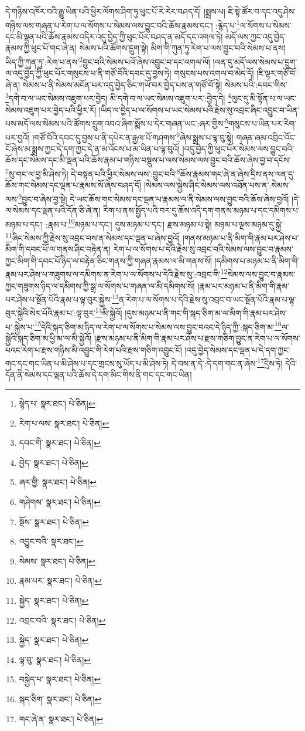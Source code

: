དེ་གཉིས་འཁོར་བའི་རྒྱུ་ཡིན་པའི་ཕྱིར་ལོགས་ཤིག་ཏུ་ཕུང་པོ་རེ་རེར་བཤད་དོ། །སྨྲས་པ། ཇི་སྟེ་ཚོར་བ་དང་འདུ་ཤེས་གཉིས་ལས་གཞན་པ་རེག་པ་ལ་སོགས་པ་སེམས་ལས་བྱུང་བའི་ཆོས་རྣམས་དང་། :རྙེད་པ་\footnote{སྙེད་པ་  སྣར་ཐང་།  པེ་ཅིན། }ལ་སོགས་པ་སེམས་དང་མི་ལྡན་པའི་ཆོས་རྣམས་འདིར་འདུ་བྱེད་ཀྱི་ཕུང་པོར་བཤད་ན་མདོ་དང་འགལ་ཏེ། མདོ་ལས་ཀྱང་འདུ་བྱེད་རྣམས་ཀྱི་ཕུང་པོ་གང་ཞེ་ན། སེམས་པའི་ཚོགས་དྲུག་སྟེ། མིག་གི་ཀུན་ཏུ་རེག་པ་ལས་བྱུང་བའི་སེམས་པ་ནས། ཡིད་ཀྱི་ཀུན་ཏུ་:རེག་པ་ནས་\footnote{རེག་པ་ལས་  སྣར་ཐང་།  པེ་ཅིན། }བྱུང་བའི་སེམས་པའོ་ཞེས་འབྱུང་བ་དང་འགལ་ལོ། །ལན་དུ་མདོ་ལས་སེམས་པ་དྲུག་ལ་འདུ་བྱེད་ཀྱི་ཕུང་པོར་གསུངས་པ་ནི་གཙོ་བོའི་དབང་དུ་བྱས་ཏེ། གསུངས་པས་འགལ་བ་མེད་དོ། །ཇི་ལྟར་གཙོ་བོ་ཞེ་ན། སེམས་པ་ནི་སེམས་མངོན་པར་འདུ་བྱེད་ཅིང་གཡོ་བར་བྱེད་པས་ན་གཙོ་བོ་སྟེ། སེམས་པའི་:དབང་གིས་\footnote{དབང་གི་  སྣར་ཐང་།  པེ་ཅིན། }དགེ་བ་ལ་ཡང་སེམས་འཇུག་པར་བྱེད། མི་དགེ་བ་ལ་ཡང་སེམས་འཇུག་པར་:བྱེད་དེ། \footnote{བྱེད་  སྣར་ཐང་།  པེ་ཅིན། }ལུང་དུ་མི་སྟོན་པ་ལ་ཡང་སེམས་འཇུག་པར་བྱེད་པའི་ཕྱིར་རོ། །ཡིད་ལ་བྱེད་པ་ལ་སོགས་པ་ཡང་སེམས་པའི་རྗེས་སུ་འབྲང་ཞིང་འབྱུང་བ་ཡིན་པས་མདོ་ལས་སེམས་པའི་ཚོགས་དྲུག་འབའ་ཞིག་སྨོས་པ་དེར་གཞན་ཡང་:ཞར་གྱིས་\footnote{ཞར་གྱི་  སྣར་ཐང་།  པེ་ཅིན། }གསུངས་པ་ཡིན་པར་རིག་པར་བྱའོ། །གཙོ་བོའི་དབང་དུ་བྱས་པ་ནི་དཔེར་ན་རྒྱལ་པོ་གཤགས་\footnote{གཤེགས་  སྣར་ཐང་།  པེ་ཅིན། }ཞེས་སྨྲས་པ་ལྟ་བུ་སྟེ། གཞན་ཞམ་འབྲིང་འོང་ངོ་ཞེས་མ་སྨྲས་ཀྱང་དེ་དག་ཀྱང་དེ་ན་མ་འོངས་པ་མ་ཡིན་པ་ལྟ་བུའོ། །འདུ་བྱེད་ཀྱི་ཕུང་པོར་སེམས་ལས་བྱུང་བའི་ཆོས་དང་སེམས་དང་མི་ལྡན་པའི་ཆོས་རྣམ་པ་གཉིས་བསྡུས་པ་ལས་སེམས་ལས་བྱུང་བའི་ཆོས་ཞེས་བྱ་བ་དངོས་\footnote{སྔོས་  སྣར་ཐང་།  པེ་ཅིན། }སུ་གང་ལ་བྱ་མི་ཤེས་ཏེ། དེ་བསྟན་པའི་ཕྱིར་སེམས་ལས་:བྱུང་བའི་\footnote{འབྱུང་བའི་  སྣར་ཐང་། }ཆོས་རྣམས་གང་ཞེ་ན་ཞེས་དྲིས་ནས་ལན་དུ་ཆོས་གང་སེམས་དང་ལྡན་པ་རྣམས་སོ་ཞེས་བཤད་དོ། །སེམས་ལས་སྐྱེས་ཤིང་སེམས་ལས་འཐོན་པས་ན་:སེམས་ལས་\footnote{སེམས་  སྣར་ཐང་།  པེ་ཅིན། }བྱུང་བ་ཞེས་བྱ་སྟེ། དེ་ཡང་ཆོས་གང་སེམས་དང་ལྡན་པ་རྣམས་ལ་ནི་སེམས་ལས་བྱུང་བའི་ཆོས་ཞེས་བྱའོ། །དེ་ལ་སེམས་དང་ལྡན་པའི་དོན་ཅི་ཞེ་ན། རིག་པ་ནས་སྤྱོད་པའི་བར་དུ་ཆོས་འདི་དག་གནས་མཉམ་པ་དང་དམིགས་པ་མཉམ་པ་དང་། :རྣམ་པ་\footnote{རྣམ་པར་  སྣར་ཐང་།  པེ་ཅིན། }མཉམ་པ་དང་། དུས་མཉམ་པ་དང་། རྫས་མཉམ་པ་སྟེ། མཉམ་པ་ལྔས་མཉམ་དུ་སྐྱེ་\footnote{སྐྱེད་  སྣར་ཐང་།  པེ་ཅིན། }ཞིང་སེམས་ཀྱི་རྗེས་སུ་འབྲང་བས་ན་སེམས་དང་ལྡན་པ་ཞེས་བྱའོ། །གནས་མཉམ་པ་ནི་མིག་གི་རྣམ་པར་ཤེས་པ་མིག་གི་དབང་པོ་ལ་གནས་ཤིང་བརྟེན་ན། རེག་པ་ལ་སོགས་པ་དེའི་རྗེས་སུ་འབྲང་བའི་སེམས་ལས་བྱུང་བ་རྣམས་ཀྱང་མིག་གི་དབང་པོ་ཉིད་ལ་བརྟེན་ཅིང་གནས་ཀྱི་གཞན་རྣམས་ལ་མི་གནས་སོ། །དམིགས་པ་མཉམ་པ་ནི་མིག་གི་རྣམ་པར་ཤེས་པ་གཟུགས་ལ་དམིགས་ན་རེག་པ་ལ་སོགས་པ་དེའི་རྗེས་སུ་:འབྲང་གི་\footnote{འབྲང་བའི་  སྣར་ཐང་།  པེ་ཅིན། }སེམས་ལས་བྱུང་བ་རྣམས་ཀྱང་གཟུགས་ཉིད་ལ་དམིགས་ཀྱི་སྒྲ་ལ་སོགས་པ་གཞན་ལ་མི་དམིགས་སོ། །རྣམ་པར་མཉམ་པ་ནི་མིག་གི་རྣམ་པར་ཤེས་པ་སྔོན་པོའི་རྣམ་པ་ལྟ་བུར་སྐྱེས་\footnote{སྐྱེད་  སྣར་ཐང་།  པེ་ཅིན། }ན་རེག་པ་ལ་སོགས་པ་དེའི་རྗེས་སུ་འབྲང་བ་ཡང་སྔོན་པོའི་རྣམ་པ་ལྟ་བུར་སྐྱེའི་སེར་པོའི་རྣམ་པ་:ལྟ་བུར་\footnote{ལྟ་བུ་  སྣར་ཐང་།  པེ་ཅིན། }མི་སྐྱེའོ། །དུས་མཉམ་པ་ནི་གང་གི་སྐད་ཅིག་མ་ལ་མིག་གི་རྣམ་པར་ཤེས་པ་:སྐྱེས་པ་\footnote{བསྐྱེད་པ་  སྣར་ཐང་།  པེ་ཅིན། }དེའི་སྐད་ཅིག་མ་ཉིད་ལ་རེག་པ་ལ་སོགས་པ་སེམས་ལས་བྱུང་བའང་དེ་ཉིད་ཀྱི་:སྐད་ཅིག་མ་\footnote{སྐད་ཅིག་  སྣར་ཐང་།  པེ་ཅིན། }ལ་སྐྱེའི་སྐད་ཅིག་མ་ཕྱི་མ་ལ་མི་སྐྱེའོ། །རྫས་མཉམ་པ་ནི་མིག་གི་རྣམ་པར་ཤེས་པ་རྫས་གཅིག་བྱུང་ན་རེག་པ་ལ་སོགས་པའང་རེག་པ་རྫས་གཉིས་མི་འབྱུང་གི་རེག་པའི་རྫས་གཅིག་འབྱུང་ངོ། །འདུ་བྱེད་སེམས་དང་ལྡན་པ་དེ་དག་ཀྱང་གང་དང་གང་ཡིན་པ་མི་ཤེས་པ་དང་གྲངས་སུ་ཡོད་པ་མི་ཤེས་ཏེ། དེ་བས་ན་དེ་:དེ་དག་གང་ན་ཞེས་\footnote{གང་ཞེ་ན་  སྣར་ཐང་།  པེ་ཅིན། }དྲིས་ཏེ། དེའི་དོན་ནི་སེམས་དང་ལྡན་པའི་ཆོས་དེ་དག་མིང་གིས་ནི་གང་དང་གང་ཡིན། 